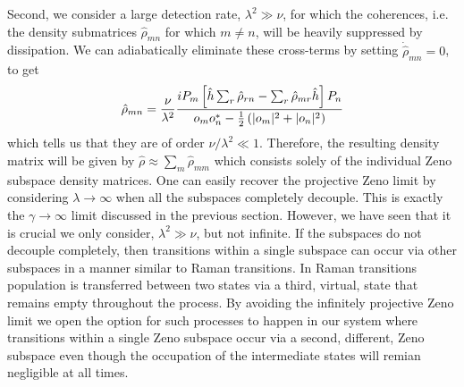 Second, we consider a large detection rate, $\lambda^2 \gg \nu$, for
which the coherences, i.e.~ the density submatrices $\hat{\rho}_{mn}$
for which $m \ne n$, will be heavily suppressed by dissipation. We can
adiabatically eliminate these cross-terms by setting
$\dot{\hat{\rho}}_{mn} = 0$, to get
\begin{equation}
\label{eq:intermediate}
\hat{\rho}_{mn} = \frac{\nu}{\lambda^2} \frac{i P_m \left[ \hat{h} \sum_r \hat{\rho}_{rn} - \sum_r \hat{\rho}_{mr} \hat{h} \right] P_n } {o_m o_n^* - \frac{1}{2} \left( |o_m|^2 + |o_n|^2 \right)}
\end{equation}
which tells us that they are of order $\nu/\lambda^2 \ll
1$. Therefore, the resulting density matrix will be given by
$\hat{\rho} \approx \sum_m \hat{\rho}_{mm}$ which consists solely of
the individual Zeno subspace density matrices. One can easily recover
the projective Zeno limit by considering $\lambda \rightarrow \infty$
when all the subspaces completely decouple. This is exactly the
$\gamma \rightarrow \infty$ limit discussed in the previous
section. However, we have seen that it is crucial we only consider,
$\lambda^2 \gg \nu$, but not infinite. If the subspaces do not
decouple completely, then transitions within a single subspace can
occur via other subspaces in a manner similar to Raman transitions. In
Raman transitions population is transferred between two states via a
third, virtual, state that remains empty throughout the process. By
avoiding the infinitely projective Zeno limit we open the option for
such processes to happen in our system where transitions within a
single Zeno subspace occur via a second, different, Zeno subspace even
though the occupation of the intermediate states will remian
negligible at all times.

